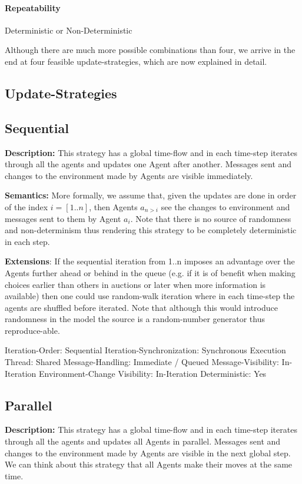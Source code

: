 \paragraph{Repeatability}
Deterministic or Non-Deterministic


Although there are much more possible combinations than four, we arrive in the end at four feasible update-strategies, which are now explained in detail.

\subsection{Update-Strategies}

\subsection{Sequential}
\textbf{Description:} This strategy has a global time-flow and in each time-step iterates through all the agents and updates one Agent after another. Messages sent and changes to the environment made by Agents are visible immediately. 

\textbf{Semantics:} More formally, we assume that, given the updates are done in order of the index $i = [1..n]$, then Agents $a_{n>i}$ see the changes to environment and messages sent to them by Agent $a_i$. Note that there is no source of randomness and non-determinism thus rendering this strategy to be completely deterministic in each step. 

\textbf{Extensions}: If the sequential iteration from 1..n imposes an advantage over the Agents further ahead or behind in the queue (e.g. if it is of benefit when making choices earlier than others in auctions or later when more information is available) then one could use random-walk iteration where in each time-step the agents are shuffled before iterated. Note that although this would introduce randomness in the model the source is a random-number generator thus reproduce-able.

	Iteration-Order:			Sequential
	Iteration-Synchronization: 	Synchronous
	Execution Thread:			Shared
 	Message-Handling:			Immediate / Queued
 	Message-Visibility:			In-Iteration
 	Environment-Change Visibility:		In-Iteration
	Deterministic:				Yes
	

\subsection{Parallel}
\textbf{Description:} This strategy has a global time-flow and in each time-step iterates through all the agents and updates all Agents in parallel. Messages sent and changes to the environment made by Agents are visible in the next global step. We can think about this strategy that all Agents make their moves at the same time. 

